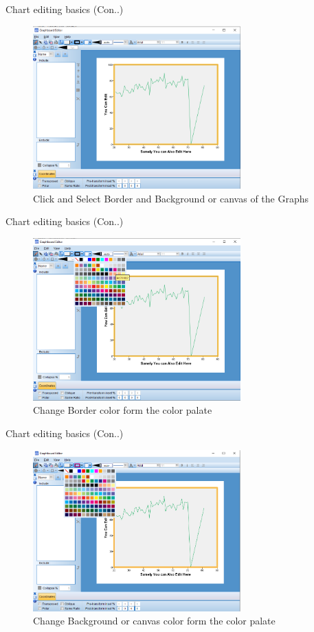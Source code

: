 \begin{frame}[t]{Chart editing basics (Con..)}
	\begin{figure}
		\centering
		\includegraphics[width=8cm]{img/edit_chart-7}
		\caption{Click and Select Border and Background or canvas of the Graphs}
	\end{figure}
\end{frame}
\begin{frame}[t]{Chart editing basics (Con..)}
	\begin{figure}
		\centering
		\includegraphics[width=8cm]{img/edit_chart-8}
		\caption{Change Border color form the color palate}
	\end{figure}
\end{frame}
\begin{frame}[t]{Chart editing basics (Con..)}
	\begin{figure}
		\centering
		\includegraphics[width=8cm]{img/edit_chart-9}
		\caption{Change Background or canvas color form the color palate}
	\end{figure}
\end{frame}
